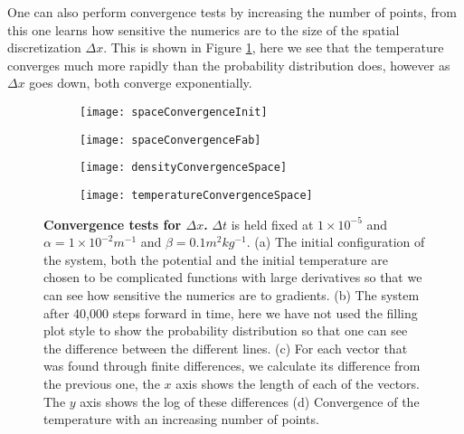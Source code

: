 One can also perform convergence tests by increasing the number of points, from this one learns how sensitive the numerics are to the size of the spatial discretization $\Delta x$. This is shown in Figure \ref{fig:spaceConvergence}, here we see that the temperature converges much more rapidly than the probability distribution does, however as $\Delta x$ goes down, both converge exponentially.

\begin{figure}
	\begin{subfigure}{0.49\textwidth}
		\texttt{[image: spaceConvergenceInit]}
	\end{subfigure}
	\begin{subfigure}{0.49\textwidth}
		\texttt{[image: spaceConvergenceFab]}
	\end{subfigure}
	
	\begin{subfigure}{0.49\textwidth}
		\texttt{[image: densityConvergenceSpace]}
	\end{subfigure}
	\begin{subfigure}{0.49\textwidth}
		\texttt{[image: temperatureConvergenceSpace]}
	\end{subfigure}
\caption{\textbf{Convergence tests for $\Delta x$.} $\Delta t$ is held fixed at $1 \times 10^{-5}$ and $\alpha = 1 \times 10^{-2} m^{-1}$ and $\beta = 0.1 m^2 kg^{-1}$. (a) The initial configuration of the system, both the potential and the initial temperature are chosen to be complicated functions with large derivatives so that we can see how sensitive the numerics are to gradients. (b) The system after 40,000 steps forward in time, here we have not used the filling plot style to show the probability distribution so that one can see the difference between the different lines. (c) For each vector that was found through finite differences, we calculate its difference from the previous one, the $x$ axis shows the length of each of the vectors. The $y$ axis shows the log of these differences (d) Convergence of the temperature with an increasing number of points. \label{fig:spaceConvergence}}
\end{figure}